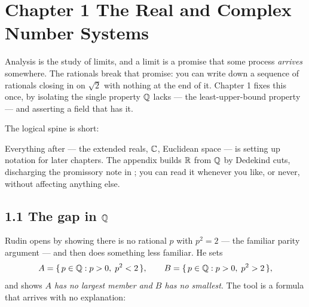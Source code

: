 \documentclass[11pt,twoside]{article}
\begin{document}
\section*{Chapter 1 \quad The Real and Complex Number Systems}

\begin{roadmap}
Analysis is the study of limits, and a limit is a promise that some process
\emph{arrives} somewhere. The rationals break that promise: you can write down a
sequence of rationals closing in on $\sqrt 2$ with nothing at the end of it.
Chapter 1 fixes this once, by isolating the single property $\mathbb{Q}$ lacks --- the
least-upper-bound property --- and asserting a field that has it.

\medskip
The logical spine is short:

\medskip
\centering
{}

\medskip
\raggedright
Everything after  --- the extended reals, $\mathbb{C}$, Euclidean space --- is
setting up notation for later chapters. The appendix builds $\mathbb{R}$ from $\mathbb{Q}$ by
Dedekind cuts, discharging the promissory note in ; you can read it
whenever you like, or never, without affecting anything else.
\end{roadmap}

\subsection*{1.1 \; The gap in $\mathbb{Q}$}

Rudin opens by showing there is no rational $p$ with $p^2 = 2$ --- the familiar
parity argument --- and then does something less familiar. He sets
\[
  A = \{\, p \in \mathbb{Q} : p > 0,\; p^2 < 2 \,\},
  \qquad
  B = \{\, p \in \mathbb{Q} : p > 0,\; p^2 > 2 \,\},
\]
and shows \emph{$A$ has no largest member and $B$ has no smallest}. The tool is a
formula that arrives with no explanation:
\end{document}

